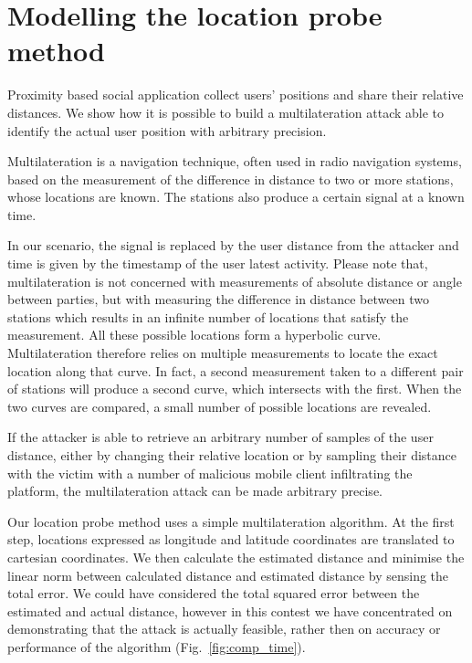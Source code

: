 \section{Modelling the location probe method}
\label{sec:loc-probe}
\noindent
Proximity based social application collect users' positions and share their relative distances. We show how it is possible to build a multilateration attack able to identify the actual user position with arbitrary precision.

Multilateration is a navigation technique, often used in radio navigation systems, based on the measurement of the difference in distance to two or more stations, whose locations are known. The stations also produce a certain signal at a known time.\

In our scenario, the signal is replaced by the user distance from the attacker and time is given by the timestamp of the user latest activity. Please note that, multilateration is not concerned with measurements of absolute distance or angle between parties, but with measuring the difference in distance between two stations which results in an infinite number of locations that satisfy the measurement. All these possible locations form a hyperbolic curve. Multilateration therefore relies on multiple measurements to locate the exact location along that curve. In fact, a second measurement taken to a different pair of stations will produce a second curve, which intersects with the first. When the two curves are compared, a small number of possible locations are revealed.

If the attacker is able to retrieve an arbitrary number of samples of the user distance, either by changing their relative location or by sampling their distance with the victim with a number of malicious mobile client infiltrating the platform, the multilateration attack can be made arbitrary precise.

Our location probe method uses a simple multilateration algorithm. At the first step, locations expressed as longitude and latitude coordinates are translated to cartesian coordinates. We then calculate the estimated distance and minimise the linear norm between calculated distance and estimated distance by sensing the total error. We could have considered the total squared error between the estimated and actual distance, however in this contest we have concentrated on demonstrating that the attack is actually feasible, rather then on accuracy or performance of the algorithm (Fig.~\ref{fig:comp_time}).

